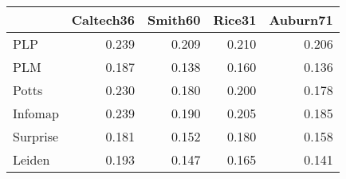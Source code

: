 \begin{tabular}{lrrrr}
\toprule
{} & Caltech36 & Smith60 & Rice31 & Auburn71 \\
\midrule
PLP      &     0.239 &   0.209 &  0.210 &    0.206 \\
PLM      &     0.187 &   0.138 &  0.160 &    0.136 \\
Potts    &     0.230 &   0.180 &  0.200 &    0.178 \\
Infomap  &     0.239 &   0.190 &  0.205 &    0.185 \\
Surprise &     0.181 &   0.152 &  0.180 &    0.158 \\
Leiden   &     0.193 &   0.147 &  0.165 &    0.141 \\
\bottomrule
\end{tabular}
